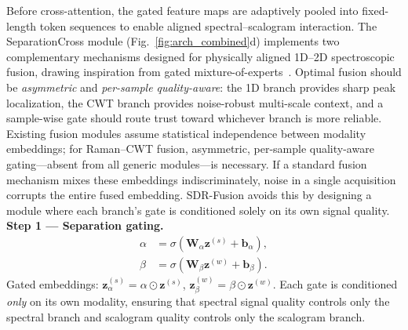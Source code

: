 \documentclass[preprint,12pt]{elsarticle}
\begin{document}
Before cross-attention, the gated feature maps are adaptively pooled into fixed-length token sequences to enable aligned spectral–scalogram interaction. The SeparationCross module (Fig.~\ref{fig:arch_combined}d) implements
two complementary mechanisms designed for physically aligned 1D--2D
spectroscopic fusion, drawing inspiration from gated
mixture-of-experts~\cite{shazeer2017outrageously}. Optimal fusion should be \emph{asymmetric} and \emph{per-sample quality-aware}: the 1D
branch provides sharp peak localization, the CWT branch provides
noise-robust multi-scale context, and a sample-wise gate should route
trust toward whichever branch is more reliable. Existing fusion modules
assume statistical independence between modality embeddings; for
Raman--CWT fusion, asymmetric, per-sample quality-aware
gating---absent from all generic modules---is necessary. If a standard
fusion mechanism mixes these embeddings indiscriminately, noise in a
single acquisition corrupts the entire fused embedding. SDR-Fusion avoids
this by designing a module where each branch's gate is conditioned
solely on its own signal quality.
\noindent\textbf{Step 1 --- Separation gating.}
\begin{align}
  \alpha &= \sigma\!\left(\mathbf{W}_\alpha\mathbf{z}^{(s)}
           +\mathbf{b}_\alpha\right), \label{eq:alpha}\\
  \beta  &= \sigma\!\left(\mathbf{W}_\beta\mathbf{z}^{(w)}
           +\mathbf{b}_\beta\right).  \label{eq:beta}
\end{align}
Gated embeddings: $\mathbf{z}_\alpha^{(s)}=\alpha\odot\mathbf{z}^{(s)}$,
$\mathbf{z}_\beta^{(w)}=\beta\odot\mathbf{z}^{(w)}$. Each gate is
conditioned \emph{only} on its own modality, ensuring that spectral
signal quality controls only the spectral branch and scalogram quality
controls only the scalogram branch.
\end{document}
